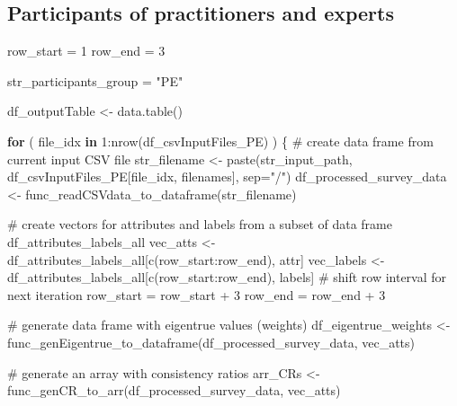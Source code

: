 \documentclass[
]{article}
\newenvironment{Shaded}{\begin{snugshade}}{\end{snugshade}}
\newcommand{\AttributeTok}[1]{\textcolor[rgb]{0.00,0.34,0.68}{#1}}
\newcommand{\CommentTok}[1]{\textcolor[rgb]{0.54,0.53,0.53}{#1}}
\newcommand{\ControlFlowTok}[1]{\textcolor[rgb]{0.12,0.11,0.11}{\textbf{#1}}}
\newcommand{\DecValTok}[1]{\textcolor[rgb]{0.69,0.50,0.00}{#1}}
\newcommand{\FunctionTok}[1]{\textcolor[rgb]{0.39,0.29,0.61}{#1}}
\newcommand{\NormalTok}[1]{\textcolor[rgb]{0.12,0.11,0.11}{#1}}
\newcommand{\OtherTok}[1]{\textcolor[rgb]{0.00,0.43,0.16}{#1}}
\newcommand{\SpecialCharTok}[1]{\textcolor[rgb]{0.24,0.68,0.91}{#1}}
\newcommand{\StringTok}[1]{\textcolor[rgb]{0.75,0.01,0.01}{#1}}
\begin{document}
\hypertarget{participants-of-practitioners-and-experts}{%
\subsection{Participants of practitioners and
experts}\label{participants-of-practitioners-and-experts}}

\begin{Shaded}
\begin{Highlighting}[]
\NormalTok{row\_start }\OtherTok{=} \DecValTok{1}
\NormalTok{row\_end }\OtherTok{=} \DecValTok{3}

\NormalTok{str\_participants\_group }\OtherTok{=} \StringTok{"PE"}

\NormalTok{df\_outputTable }\OtherTok{\textless{}{-}} \FunctionTok{data.table}\NormalTok{()}

\ControlFlowTok{for}\NormalTok{ ( file\_idx }\ControlFlowTok{in} \DecValTok{1}\SpecialCharTok{:}\FunctionTok{nrow}\NormalTok{(df\_csvInputFiles\_PE) ) \{}
  \CommentTok{\# create data frame from current input CSV file}
\NormalTok{  str\_filename }\OtherTok{\textless{}{-}} \FunctionTok{paste}\NormalTok{(str\_input\_path, df\_csvInputFiles\_PE[file\_idx, filenames], }\AttributeTok{sep=}\StringTok{"/"}\NormalTok{)}
\NormalTok{  df\_processed\_survey\_data }\OtherTok{\textless{}{-}} \FunctionTok{func\_readCSVdata\_to\_dataframe}\NormalTok{(str\_filename)}
  
  \CommentTok{\# create vectors for attributes and labels from a subset of data frame \textquotesingle{}df\_attributes\_labels\_all\textquotesingle{}}
\NormalTok{  vec\_atts }\OtherTok{\textless{}{-}}\NormalTok{ df\_attributes\_labels\_all[}\FunctionTok{c}\NormalTok{(row\_start}\SpecialCharTok{:}\NormalTok{row\_end), attr]}
\NormalTok{  vec\_labels }\OtherTok{\textless{}{-}}\NormalTok{ df\_attributes\_labels\_all[}\FunctionTok{c}\NormalTok{(row\_start}\SpecialCharTok{:}\NormalTok{row\_end), labels]}
  \CommentTok{\# shift row interval for next iteration}
\NormalTok{  row\_start }\OtherTok{=}\NormalTok{ row\_start }\SpecialCharTok{+} \DecValTok{3}
\NormalTok{  row\_end }\OtherTok{=}\NormalTok{ row\_end }\SpecialCharTok{+} \DecValTok{3}
  
  \CommentTok{\# generate data frame with eigentrue values (weights) }
\NormalTok{  df\_eigentrue\_weights }\OtherTok{\textless{}{-}} \FunctionTok{func\_genEigentrue\_to\_dataframe}\NormalTok{(df\_processed\_survey\_data, vec\_atts)}
  
  \CommentTok{\# generate an array with consistency ratios}
\NormalTok{  arr\_CRs }\OtherTok{\textless{}{-}} \FunctionTok{func\_genCR\_to\_arr}\NormalTok{(df\_processed\_survey\_data, vec\_atts)}


\end{Highlighting}
\end{Shaded}
\end{document}
